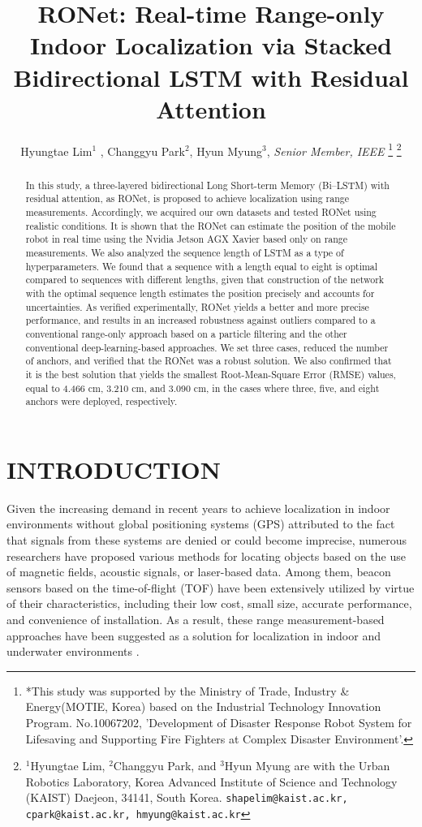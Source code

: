\documentclass[letterpaper, 10 pt, conference]{ieeeconf}
\title{\LARGE \bf
RONet: Real-time Range-only Indoor Localization via Stacked Bidirectional LSTM with Residual Attention}
\author{Hyungtae Lim$^{1}$ , Changgyu Park$^{2}$, Hyun Myung$^{3}$, \textit{Senior Member, IEEE}%
\thanks{
	*This study was supported by the Ministry of Trade, Industry \& Energy(MOTIE, Korea) based on the Industrial Technology Innovation Program. No.10067202, 'Development of Disaster Response Robot System for Lifesaving and Supporting Fire Fighters at Complex Disaster Environment'.}%
\thanks{$^{1}$Hyungtae Lim, $^{2}$Changgyu Park, and $^{3}$Hyun Myung are with
	the Urban Robotics Laboratory, Korea Advanced Institute of Science
	and Technology (KAIST) Daejeon, 34141, South Korea. {\tt\small shapelim@kaist.ac.kr, cpark@kaist.ac.kr, hmyung@kaist.ac.kr}}%
%
}
\begin{document}

\maketitle
\thispagestyle{empty}
\pagestyle{empty}

\begin{abstract}

In this study, a three-layered bidirectional Long Short-term Memory (Bi--LSTM) with residual attention, as RONet, is proposed to achieve localization using range measurements. Accordingly, we acquired our own datasets and tested RONet using realistic conditions. It is shown that the RONet can estimate the position of the mobile robot in real time using the Nvidia Jetson AGX Xavier based only on range measurements. We also analyzed the sequence length of LSTM as a type of hyperparameters. We found that a sequence with a length equal to eight is optimal compared to sequences with different lengths, given that construction of the network with the optimal sequence length estimates the position precisely and accounts for uncertainties. As verified experimentally, RONet yields a better and more precise performance, and results in an increased robustness against outliers compared to a conventional range-only approach based on a particle filtering and the other conventional deep-learning-based approaches. We set three cases, reduced the number of anchors, and verified that the RONet was a robust solution. We also confirmed that it is the best solution that yields the smallest Root-Mean-Square Error (RMSE) values, equal to 4.466 cm, 3.210 cm, and 3.090 cm, in the cases where three, five, and eight anchors were deployed, respectively.   

\end{abstract}

\section{INTRODUCTION}

Given the increasing demand in recent years to achieve localization in indoor environments without global positioning systems (GPS) attributed to the fact that signals from these systems are denied or could become imprecise, numerous researchers have proposed various methods for locating objects based on the use of magnetic fields, acoustic signals, or laser-based data\cite{jung2015magnetic2,medina2013ultrasound,li2014lidar}. Among them, beacon sensors based on the time-of-flight (TOF) have been extensively utilized by virtue of their characteristics, including their low cost, small size, accurate performance, and convenience of installation. As a result, these range measurement-based approaches have been suggested as a solution for localization in indoor \cite{peneda2009trilateration,jung2011indoor} and underwater environments \cite{newman2003pure, olson2006robust}.
\end{document}
